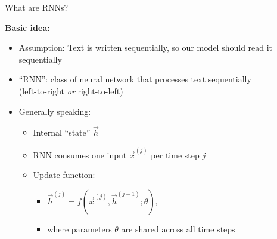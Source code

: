 \documentclass[11pt,compress,t,notes=noshow, xcolor=table]{beamer}
\begin{document}


\begin{vbframe}{What are RNNs?}

\vfill

\textbf{Basic idea:}

\begin{itemize}
	\item Assumption: Text is written sequentially, so our model should read it sequentially
	\item ``RNN'': class of neural network that processes text sequentially\\
				(left-to-right \textit{or} right-to-left)
	\item Generally speaking:
		\begin{itemize}
			\item Internal ``state'' $\vec h$
			\item RNN consumes one input $\vec x^{(j)}$ per time step $j$
			\item Update function:
			\begin{itemize}
				\item $\vec h^{(j)} = f(\vec x^{(j)}, \vec h^{({j-1})}; \theta)$,
				\item where parameters $\theta$ are shared across all time steps
			\end{itemize}
		\end{itemize}
\end{itemize}

\vfill

\end{vbframe}

\end{document}
